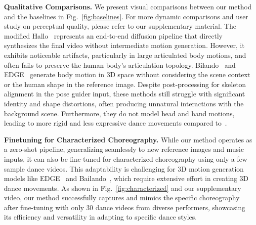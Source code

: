 \noindent \textbf{Qualitative Comparisons.}
We present visual comparisons between our method and the baselines in Fig.~\ref{fig:baselines}. For more dynamic comparisons and user study on perceptual quality, please refer to our supplementary material. The modified Hallo~\cite{hallo} represents an end-to-end diffusion pipeline that directly synthesizes the final video without intermediate motion generation. However, it exhibits noticeable artifacts, particularly in large articulated body motions, and often fails to preserve the human body's articulation topology.  Bilando~\cite{bailando} and EDGE~\cite{edge} generate body motion in 3D space without considering the scene context or the human shape in the reference image. Despite post-processing for skeleton alignment in the pose guider input, these methods still struggle with significant identity and shape distortions, often producing unnatural interactions with the background scene. Furthermore, they do not model head and hand motions, leading to more rigid and less expressive dance movements compared to~\papername.


\noindent \textbf{Finetuning for Characterized Choreography.} While our method operates as a zero-shot pipeline, generalizing seamlessly to new reference images and music inputs, it can also be fine-tuned for characterized choreography using only a few sample dance videos. This adaptability is challenging for 3D motion generation models like EDGE~\cite{edge} and Bailando~\cite{bailando}, which require extensive effort in creating 3D dance movements. As shown in Fig.~\ref{fig:characterized} and our supplementary video, our method successfully captures and mimics the specific choreography after fine-tuning with only 30 dance videos from diverse performers, showcasing its efficiency and versatility in adapting to specific dance styles. 


